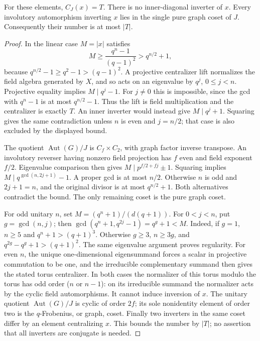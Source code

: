 \documentclass[10pt]{article}
\begin{document}
\begin{lemma}\label{regular}
For these elements, $C_J(x)=T$. There is no inner-diagonal inverter of $x$.
Every involutory automorphism inverting $x$ lies in the single pure graph
coset of $J$. Consequently their number is at most $|T|$.
\end{lemma}
\begin{proof}
In the linear case $M=|x|$ satisfies
\[
 M\ge\frac{q^n-1}{(q-1)^2}>q^{n/2}+1,
\]
because $q^{n/2}-1\ge q^2-1>(q-1)^2$. A projective centralizer lift
normalizes the field algebra generated by $X$, and so acts on an eigenvalue
by $q^j$, $0\le j<n$. Projective equality implies $M\mid q^j-1$.
For $j\ne0$ this is impossible, since the gcd with $q^n-1$ is at most
$q^{n/2}-1$. Thus the lift is field multiplication and the centralizer is
exactly $T$. An inner inverter would instead give $M\mid q^j+1$.
Squaring gives the same contradiction unless $n$ is even and $j=n/2$;
that case is also excluded by the displayed bound.

The quotient $\operatorname{Aut}(G)/J$ is $C_f\times C_2$, with graph
factor inverse transpose. An involutory reverser having nonzero field
projection has $f$ even and field exponent $f/2$. Eigenvalue comparison
then gives $M\mid p^{f/2+fj}\pm1$. Squaring implies
$M\mid q^{\gcd(n,2j+1)}-1$. A proper gcd is at most $n/2$. Otherwise
$n$ is odd and $2j+1=n$, and the original divisor is at most
$q^{n/2}+1$. Both alternatives contradict the bound. The only remaining
coset is the pure graph coset.

For odd unitary $n$, set $M=(q^n+1)/(d(q+1))$. For $0<j<n$, put
$g=\gcd(n,j)$; then
$\gcd(q^n+1,q^{2j}-1)=q^g+1<M$. Indeed, if $g=1$, $n\ge5$ and
$q^n+1>(q+1)^3$. Otherwise $g\ge3$, $n\ge3g$, and
$q^{2g}-q^g+1>(q+1)^2$. The same eigenvalue argument proves regularity.
For even $n$, the unique one-dimensional eigensummand forces a scalar in
projective commutation to be one, and the irreducible complementary summand
then gives the stated torus centralizer. In both cases the normalizer of
this torus modulo the torus has odd order ($n$ or $n-1$): on its irreducible
summand the normalizer acts by the cyclic field automorphisms. It cannot
induce inversion of $x$. The unitary quotient $\operatorname{Aut}(G)/J$
is cyclic of order $2f$; its sole nonidentity element of order two is the
$q$-Frobenius, or graph, coset. Finally two inverters in the same coset differ
by an element centralizing $x$. This bounds the number by $|T|$; no assertion
that all inverters are conjugate is needed.
\end{proof}
\end{document}
